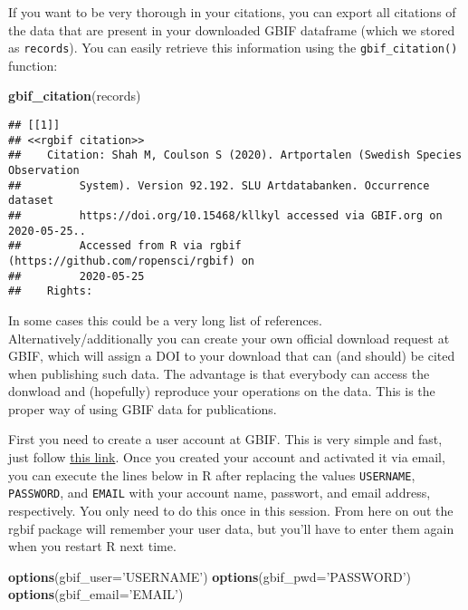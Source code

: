 \documentclass[]{article}
\newenvironment{Shaded}{\begin{snugshade}}{\end{snugshade}}
\newcommand{\DataTypeTok}[1]{\textcolor[rgb]{0.13,0.29,0.53}{#1}}
\newcommand{\KeywordTok}[1]{\textcolor[rgb]{0.13,0.29,0.53}{\textbf{#1}}}
\newcommand{\NormalTok}[1]{#1}
\newcommand{\StringTok}[1]{\textcolor[rgb]{0.31,0.60,0.02}{#1}}
\begin{document}
If you want to be very thorough in your citations, you can export all
citations of the data that are present in your downloaded GBIF dataframe
(which we stored as \texttt{records}). You can easily retrieve this
information using the \texttt{gbif\_citation()} function:

\begin{Shaded}
\begin{Highlighting}[]
\KeywordTok{gbif_citation}\NormalTok{(records)}
\end{Highlighting}
\end{Shaded}

\begin{verbatim}
## [[1]]
## <<rgbif citation>>
##    Citation: Shah M, Coulson S (2020). Artportalen (Swedish Species Observation
##         System). Version 92.192. SLU Artdatabanken. Occurrence dataset
##         https://doi.org/10.15468/kllkyl accessed via GBIF.org on 2020-05-25..
##         Accessed from R via rgbif (https://github.com/ropensci/rgbif) on
##         2020-05-25
##    Rights:
\end{verbatim}

In some cases this could be a very long list of references.
Alternatively/additionally you can create your own official download
request at GBIF, which will assign a DOI to your download that can (and
should) be cited when publishing such data. The advantage is that
everybody can access the donwload and (hopefully) reproduce your
operations on the data. This is the proper way of using GBIF data for
publications.

First you need to create a user account at GBIF. This is very simple and
fast, just follow \href{https://www.gbif.org/user/profile}{this link}.
Once you created your account and activated it via email, you can
execute the lines below in R after replacing the values
\texttt{USERNAME}, \texttt{PASSWORD}, and \texttt{EMAIL} with your
account name, passwort, and email address, respectively. You only need
to do this once in this session. From here on out the rgbif package will
remember your user data, but you'll have to enter them again when you
restart R next time.

\begin{Shaded}
\begin{Highlighting}[]
\KeywordTok{options}\NormalTok{(}\DataTypeTok{gbif_user=}\StringTok{'USERNAME'}\NormalTok{)}
\KeywordTok{options}\NormalTok{(}\DataTypeTok{gbif_pwd=}\StringTok{'PASSWORD'}\NormalTok{)}
\KeywordTok{options}\NormalTok{(}\DataTypeTok{gbif_email=}\StringTok{'EMAIL'}\NormalTok{)}
\end{Highlighting}
\end{Shaded}
\end{document}
